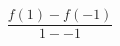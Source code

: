 \documentclass[preview]{standalone}
\begin{document}
\begin{align*}
\dfrac{f(1) - f(-1)}{1 - -1}
\end{align*}
\end{document}
